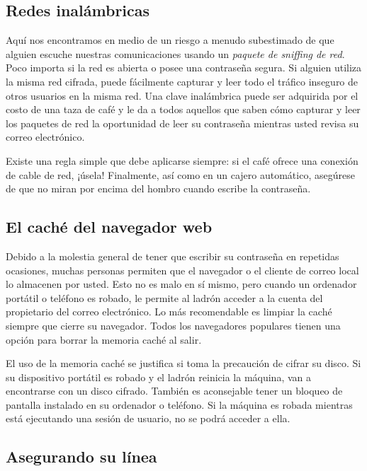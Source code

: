 \documentclass[10pt,a5paper,twoside,,]{book}
\begin{document}
\subsection{Redes inalámbricas}\label{redes-inaluxe1mbricas}

Aquí nos encontramos en medio de un riesgo a menudo subestimado de que
alguien escuche nuestras comunicaciones usando un \emph{paquete de
sniffing de red}. Poco importa si la red es abierta o posee una
contraseña segura. Si alguien utiliza la misma red cifrada, puede
fácilmente capturar y leer todo el tráfico inseguro de otros usuarios en
la misma red. Una clave inalámbrica puede ser adquirida por el costo de
una taza de café y le da a todos aquellos que saben cómo capturar y leer
los paquetes de red la oportunidad de leer su contraseña mientras usted
revisa su correo electrónico.

Existe una regla simple que debe aplicarse siempre: si el café ofrece
una conexión de cable de red, ¡úsela! Finalmente, así como en un cajero
automático, asegúrese de que no miran por encima del hombro cuando
escribe la contraseña.

\subsection{El caché del navegador
web}\label{el-cachuxe9-del-navegador-web}

Debido a la molestia general de tener que escribir su contraseña en
repetidas ocasiones, muchas personas permiten que el navegador o el
cliente de correo local lo almacenen por usted. Esto no es malo en sí
mismo, pero cuando un ordenador portátil o teléfono es robado, le
permite al ladrón acceder a la cuenta del propietario del correo
electrónico. Lo más recomendable es limpiar la caché siempre que cierre
su navegador. Todos los navegadores populares tienen una opción para
borrar la memoria caché al salir.

El uso de la memoria caché se justifica si toma la precaución de cifrar
su disco. Si su dispositivo portátil es robado y el ladrón reinicia la
máquina, van a encontrarse con un disco cifrado. También es aconsejable
tener un bloqueo de pantalla instalado en su ordenador o teléfono. Si la
máquina es robada mientras está ejecutando una sesión de usuario, no se
podrá acceder a ella.

\subsection{Asegurando su línea}\label{asegurando-su-luxednea}
\end{document}
